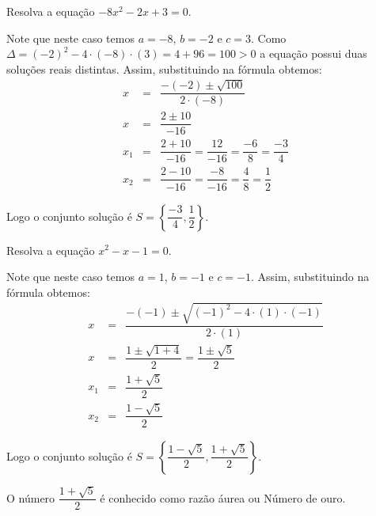  \begin{exem}
  Resolva a equação $-8x^2 - 2x + 3= 0$.

 Note que neste caso temos $a= -8$, $b= -2$ e $c= 3$.
  Como $\Delta=(-2)^2 - 4 \cdot (-8) \cdot (3) = 4+96=100>0$ a equação possui duas soluções reais distintas.
  Assim, substituindo na fórmula obtemos:
 \begin{eqnarray*}
 x &=& \dfrac{-(-2) \pm \sqrt{100}}{2 \cdot (-8)} \\
 x &=& \dfrac{2 \pm 10}{-16} \\
 x_1 &=& \dfrac{2 + 10}{-16}= \dfrac{12}{-16}= \dfrac{-6}{8}= \dfrac{-3}{4} \\
 x_2 &=& \dfrac{2 - 10}{-16}= \dfrac{-8}{-16}= \dfrac{4}{8}= \dfrac{1}{2}
 \end{eqnarray*}

 Logo o conjunto solução é $S= \left\{ \dfrac{-3}{4}, \dfrac{1}{2} \right\}$.
\end{exem}
 
 \begin{exem}
   Resolva a equação $x^2 - x - 1= 0$.

 Note que neste caso temos $a= 1$, $b= -1$ e $c= -1$.
  Assim, substituindo na fórmula obtemos:
 \begin{eqnarray*}
 x &=& \dfrac{-(-1) \pm \sqrt{(-1)^2 - 4 \cdot (1) \cdot (-1)}}{2 \cdot (1)} \\
 x &=& \dfrac{1 \pm \sqrt{1 + 4}}{2}= \dfrac{1 \pm \sqrt{5}}{2} \\
 x_1 &=& \dfrac{1 + \sqrt{5}}{2} \\
 x_2 &=& \dfrac{1 - \sqrt{5}}{2}
 \end{eqnarray*}

 Logo o conjunto solução é $S= \left\{ \dfrac{1 - \sqrt{5}}{2}, \dfrac{1 + \sqrt{5}}{2} \right\}$.

 O número $\dfrac{1 + \sqrt{5}}{2}$ é conhecido como razão áurea ou Número de ouro.
 \end{exem}
 


